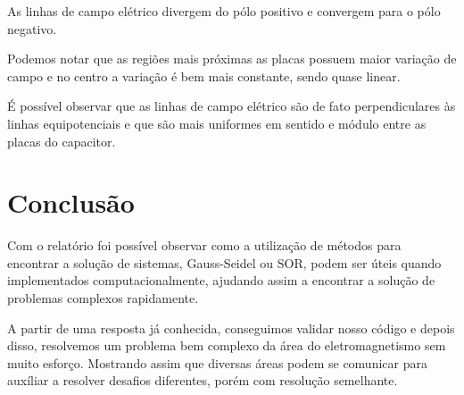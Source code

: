 \documentclass[
12pt,				%
oneside,			%
a4paper,			%
english,			%
french,				%
spanish,			%
brazil				%
]{abntex2}
\begin{document}
 As linhas de campo elétrico divergem do pólo positivo e convergem para o pólo negativo.

Podemos notar que as regiões mais próximas as placas possuem maior variação de campo e no centro a variação é bem mais constante, sendo quase linear.

É possível observar que as linhas de campo elétrico são de fato perpendiculares às linhas equipotenciais e que são mais uniformes em sentido e módulo entre as placas do capacitor.



\chapter{Conclusão}

Com o relatório foi possível observar como a utilização de métodos para encontrar a solução de sistemas, Gauss-Seidel ou SOR, podem ser úteis quando implementados computacionalmente, ajudando assim a encontrar a solução de problemas complexos rapidamente.

A partir de uma resposta já conhecida, conseguimos validar nosso código e depois disso, resolvemos um problema bem complexo da área do eletromagnetismo sem muito esforço. Mostrando assim que diversas áreas podem se comunicar para auxíliar a resolver desafios diferentes, porém com resolução semelhante.

\postextual


%
%
\end{document}
